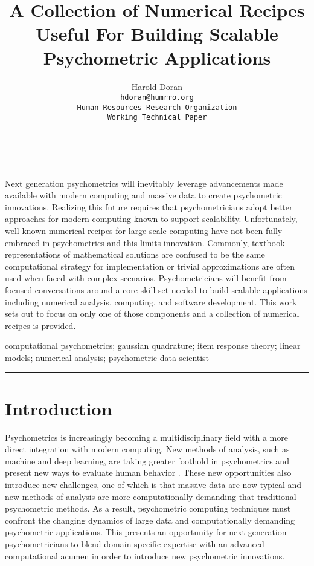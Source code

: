 \documentclass[12pt]{article}
\title{A Collection of Numerical Recipes Useful For Building Scalable Psychometric Applications}
\author{Harold Doran\\
	\texttt{hdoran@humrro.org}\\
	\texttt{Human Resources Research Organization}\\
	\texttt{Working Technical Paper}\\	\\
	}
\renewenvironment{abstract}
 {\quotation\small\noindent\rule{\linewidth}{.5pt}\par\smallskip
  {\centering\bfseries\abstractname\par}\medskip}
 {\par\noindent\rule{\linewidth}{.5pt}\endquotation}
\begin{document}
 
\maketitle

\begin{abstract}

Next generation psychometrics will inevitably leverage advancements made available with modern computing and massive data to create psychometric innovations. Realizing this future requires that psychometricians adopt better approaches for modern computing known to support scalability. Unfortunately, well-known numerical recipes for large-scale computing have not been fully embraced in psychometrics and this limits innovation. Commonly, textbook representations of mathematical solutions are confused to be the same computational strategy for implementation or trivial approximations are often used when faced with complex scenarios. Psychometricians will benefit from focused conversations around a core skill set needed to build scalable applications including numerical analysis, computing, and software development. This work sets out to focus on only one of those components and a collection of numerical recipes is provided. 
 
\vspace{0.2in}

 computational psychometrics; gaussian quadrature; item response theory; linear models; numerical analysis; psychometric data scientist

\end{abstract}

\section*{Introduction}

Psychometrics is increasingly becoming a multidisciplinary field with a more direct integration with modern computing. New methods of analysis, such as machine and deep learning, are taking greater foothold in psychometrics and present new ways to evaluate human behavior \cite{act}. These new opportunities also introduce new challenges, one of which is that massive data are now typical and new methods of analysis are more computationally demanding that traditional psychometric methods. As a result, psychometric computing techniques must confront the changing dynamics of large data and computationally demanding psychometric applications. This presents an opportunity for next generation psychometricians to blend domain-specific expertise with an advanced computational acumen in order to introduce new psychometric innovations.
\end{document}
